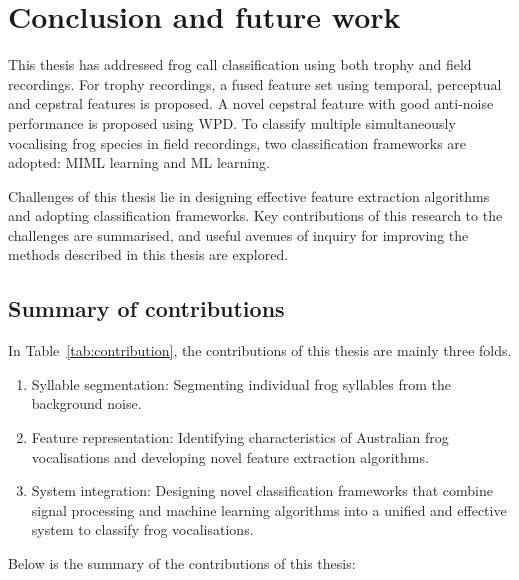 
\chapter[Conclusion]{Conclusion and future work}
\label{cha:cha8Conclusions}

This thesis has addressed frog call classification using both trophy and field recordings. For trophy recordings, a fused feature set using temporal, perceptual and cepstral features is proposed. A novel cepstral feature with good anti-noise performance is proposed using WPD. 
To classify multiple simultaneously vocalising frog species in field recordings, two classification frameworks are adopted: MIML learning and ML learning. 

Challenges of this thesis lie in designing effective feature extraction algorithms and adopting classification frameworks. Key contributions of this research to the challenges are summarised, and useful avenues of inquiry for improving the methods described in this thesis are explored.

\section{Summary of contributions}
	
In Table~\ref{tab:contribution}, the contributions of this thesis are mainly three folds.

\begin{enumerate}
\item Syllable segmentation: Segmenting individual frog syllables from the background noise.

\item Feature representation: Identifying characteristics of Australian frog vocalisations and developing novel feature extraction algorithms.

\item System integration: Designing novel classification frameworks that combine signal processing and machine learning algorithms into a unified and effective system to classify frog vocalisations.

\end{enumerate}

Below is the summary of the contributions of this thesis:

	
